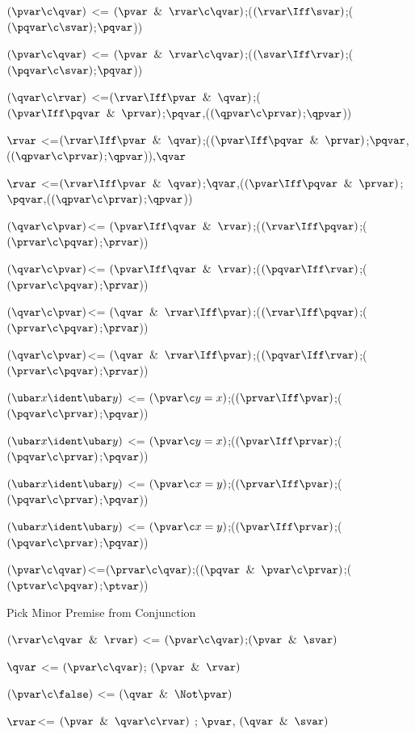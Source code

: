 $(\pvar \c \qvar)$ <= $(\pvar \And \rvar \c \qvar)$;($(\rvar \Iff \svar)$;($(\pqvar \c \svar)$;$\pqvar$))

$(\pvar \c \qvar)$ <= $(\pvar \And \rvar \c \qvar)$;($(\svar \Iff \rvar)$;($(\pqvar \c \svar)$;$\pqvar$))

$(\qvar \c \rvar)$ <=$(\rvar\Iff \pvar \And \qvar)$;($(\pvar \Iff \pqvar \And \prvar)$;$\pqvar$,($(\qpvar \c \prvar)$;$\qpvar$))

$\rvar $ <=$(\rvar\Iff \pvar \And \qvar)$;($(\pvar \Iff \pqvar \And \prvar)$;$\pqvar$,($(\qpvar \c \prvar)$;$\qpvar$)),$\qvar$

$\rvar $ <=$(\rvar\Iff \pvar \And \qvar)$;$\qvar$,($(\pvar \Iff \pqvar \And \prvar)$;$\pqvar$,($(\qpvar \c \prvar)$;$\qpvar$))

$(\qvar \c \pvar)$<= $(\pvar \Iff \qvar \And \rvar)$;($(\rvar \Iff \pqvar)$;($(\prvar \c \pqvar)$;$\prvar$))

$(\qvar \c \pvar)$<= $(\pvar \Iff \qvar \And \rvar)$;($(\pqvar \Iff \rvar)$;($(\prvar \c \pqvar)$;$\prvar$))

$(\qvar \c \pvar)$<= $(\qvar \And \rvar \Iff \pvar)$;($(\rvar \Iff \pqvar)$;($(\prvar \c \pqvar)$;$\prvar$))

$(\qvar \c \pvar)$<= $(\qvar \And \rvar \Iff \pvar)$;($(\pqvar \Iff \rvar)$;($(\prvar \c \pqvar)$;$\prvar$))

$(\ubar x \ident \ubar y)$ <= $(\pvar \c y = x)$;($(\prvar\Iff\pvar)$;($(\pqvar\c\prvar)$;$\pqvar$))

$(\ubar x \ident \ubar y)$ <= $(\pvar \c y = x)$;($(\pvar\Iff\prvar)$;($(\pqvar\c\prvar)$;$\pqvar$))

$(\ubar x \ident \ubar y)$ <= $(\pvar \c x = y)$;($(\prvar\Iff\pvar)$;($(\pqvar\c\prvar)$;$\pqvar$))

$(\ubar x \ident \ubar y)$ <= $(\pvar \c x = y)$;($(\pvar\Iff\prvar)$;($(\pqvar\c\prvar)$;$\pqvar$))

$(\pvar \c\qvar )$<=$(\prvar \c \qvar )$;($(\pqvar \And \pvar \c \prvar)$;($(\ptvar \c \pqvar)$;$\ptvar$))

\lineb

Pick Minor Premise from Conjunction
\lineb

$(\rvar \c \qvar\And \rvar)$ <= $(\pvar \c \qvar )$;$(\pvar\And \svar)$

$\qvar$ <=  $(\pvar \c \qvar)$; $(\pvar \And \rvar)$

$(\pvar \c \false)$ <= $(\qvar \And \Not \pvar)$

$\rvar$<= $(\pvar \And \qvar \c \rvar)$ ; $\pvar$, $(\qvar \And \svar)$

